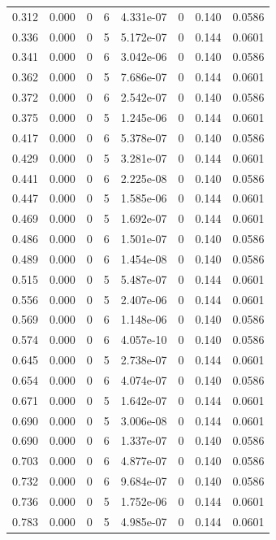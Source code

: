 \documentclass[preview]{standalone}
\begin{document}
{{\begin{tabular}{L{1.2cm}C{1.2cm} C{0.3cm}C{0.5cm} C{1.4cm}C{1.4cm} C{1.4cm}C{1.4cm}}
  0.312  &  0.000  & 0     &  6 &  4.331e-07  & 0  & 0.140 &  0.0586   \\ 
  0.336  &  0.000  & 0     &  5 &  5.172e-07  & 0  & 0.144 &  0.0601   \\ 
  0.341  &  0.000  & 0     &  6 &  3.042e-06  & 0  & 0.140 &  0.0586   \\ 
  0.362  &  0.000  & 0     &  5 &  7.686e-07  & 0  & 0.144 &  0.0601   \\ 
  0.372  &  0.000  & 0     &  6 &  2.542e-07  & 0  & 0.140 &  0.0586   \\ 
  0.375  &  0.000  & 0     &  5 &  1.245e-06  & 0  & 0.144 &  0.0601   \\ 
  0.417  &  0.000  & 0     &  6 &  5.378e-07  & 0  & 0.140 &  0.0586   \\ 
  0.429  &  0.000  & 0     &  5 &  3.281e-07  & 0  & 0.144 &  0.0601   \\ 
  0.441  &  0.000  & 0     &  6 &  2.225e-08  & 0  & 0.140 &  0.0586   \\ 
  0.447  &  0.000  & 0     &  5 &  1.585e-06  & 0  & 0.144 &  0.0601   \\ 
  0.469  &  0.000  & 0     &  5 &  1.692e-07  & 0  & 0.144 &  0.0601   \\ 
  0.486  &  0.000  & 0     &  6 &  1.501e-07  & 0  & 0.140 &  0.0586   \\ 
  0.489  &  0.000  & 0     &  6 &  1.454e-08  & 0  & 0.140 &  0.0586   \\ 
  0.515  &  0.000  & 0     &  5 &  5.487e-07  & 0  & 0.144 &  0.0601   \\ 
  0.556  &  0.000  & 0     &  5 &  2.407e-06  & 0  & 0.144 &  0.0601   \\ 
  0.569  &  0.000  & 0     &  6 &  1.148e-06  & 0  & 0.140 &  0.0586   \\ 
  0.574  &  0.000  & 0     &  6 &  4.057e-10  & 0  & 0.140 &  0.0586   \\ 
  0.645  &  0.000  & 0     &  5 &  2.738e-07  & 0  & 0.144 &  0.0601   \\ 
  0.654  &  0.000  & 0     &  6 &  4.074e-07  & 0  & 0.140 &  0.0586   \\ 
  0.671  &  0.000  & 0     &  5 &  1.642e-07  & 0  & 0.144 &  0.0601   \\ 
  0.690  &  0.000  & 0     &  5 &  3.006e-08  & 0  & 0.144 &  0.0601   \\ 
  0.690  &  0.000  & 0     &  6 &  1.337e-07  & 0  & 0.140 &  0.0586   \\ 
  0.703  &  0.000  & 0     &  6 &  4.877e-07  & 0  & 0.140 &  0.0586   \\ 
  0.732  &  0.000  & 0     &  6 &  9.684e-07  & 0  & 0.140 &  0.0586   \\ 
  0.736  &  0.000  & 0     &  5 &  1.752e-06  & 0  & 0.144 &  0.0601   \\ 
  0.783  &  0.000  & 0     &  5 &  4.985e-07  & 0  & 0.144 &  0.0601   \\ 
\hline 
\end{tabular} 

}}
\end{document}
